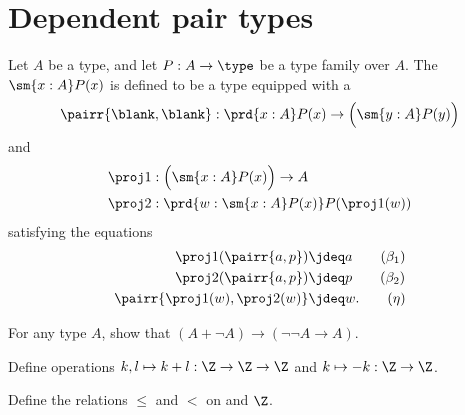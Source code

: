\section{Dependent pair types}

\begin{defn}
Let $A$ be a type, and let $P:A\to\type$ be a type family over $A$.
The  $\sm{x:A}P(x)$ is defined to be a type equipped with a 
\begin{equation*}
\pairr{\blank,\blank}:\prd{x:A} P(x)\to \Big(\sm{y:A}P(y)\Big)
\end{equation*}
and 
\begin{align*}
\proj 1 & : \Big(\sm{x:A}P(x)\Big)\to A \\
\proj 2 & : \prd{w:\sm{x:A}P(x)}P(\proj 1(w))
\end{align*}
satisfying the equations
\begin{align*}
\proj 1(\pairr{a,p}) & \jdeq a \tag{$\beta_1$}\\
\proj 2(\pairr{a,p}) & \jdeq p \tag{$\beta_2$}\\
\pairr{\proj 1(w),\proj 2(w)} & \jdeq w. \tag{$\eta$}
\end{align*}
\end{defn}

\begin{exercises}
\item For any type $A$, show that $(A+\neg A)\to(\neg\neg A\to A)$. 
\item \label{ex:int_group_ops}Define operations $k,l\mapsto k+l:\Z\to\Z\to\Z$ and $k\mapsto -k:\Z\to \Z$.
\item \label{ex:int_order}Define the relations $\leq$ and $<$ on and $\Z$.
\end{exercises}
